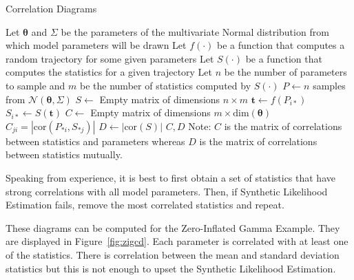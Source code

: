 \begin{singlespace}
    \begin{algorithm}[H]
        \caption{Correlation Diagrams}
        \label{alg:cor_diag}
        \begin{algorithmic}
            \State Let $\pmb{\theta}$ and $\Sigma$ be the parameters of the multivariate Normal distribution from which model parameters will be drawn
            \State Let $f(\cdot)$ be a function that computes a random trajectory for some given parameters
            \State Let $S(\cdot)$ be a function that computes the statistics for a given trajectory
            \State Let $n$ be the number of parameters to sample and $m$ be the number of statistics computed by $S(\cdot)$
            \newline
                \State $P \gets n$ samples from $\mathcal{N}(\pmb{\theta}, \Sigma)$
                \State $S \gets $ Empty matrix of dimensions $n \times m$
                    \State $\pmb{t} \gets f(P_{i*})$
                    \State $S_{i*} \gets S(\pmb{t})$
                \EndFor
                \State $C \gets $ Empty matrix of dimensions $m \times \text{dim}(\pmb{\theta})$
                        \State $C_{ji} = |\text{cor}(P_{*i}, S_{*j})|$
                    \EndFor
                \EndFor
                \State $D \gets |\text{cor}(S)|$
                \State \Return $C, D$
            \EndProcedure
            \newline
            \State Note: $C$ is the matrix of correlations between statistics and parameters whereas $D$ is the matrix of correlations between statistics mutually.
        \end{algorithmic}
    \end{algorithm}
\end{singlespace}

Speaking from experience, it is best to first obtain a set of statistics that have strong correlations with all model parameters. Then, if Synthetic Likelihood Estimation fails, remove the most correlated statistics and repeat.

These diagrams can be computed for the Zero-Inflated Gamma Example. They are displayed in Figure~\ref{fig:zigcd}. Each parameter is correlated with at least one of the statistics. There is correlation between the mean and standard deviation statistics but this is not enough to upset the Synthetic Likelihood Estimation.

